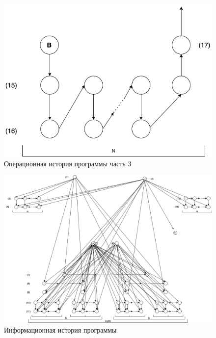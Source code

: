 \begin{figure}[h!]
	\begin{center}
		\includegraphics[scale=0.6]{assets/2_3.png}
	\end{center}
	\caption{Операционная история программы часть 3}
\end{figure}



\begin{figure}[h!]
	\begin{center}
		\includegraphics[scale=0.4]{assets/3.drawio.png}
	\end{center}
	\caption{Информационная история программы}
\end{figure}
